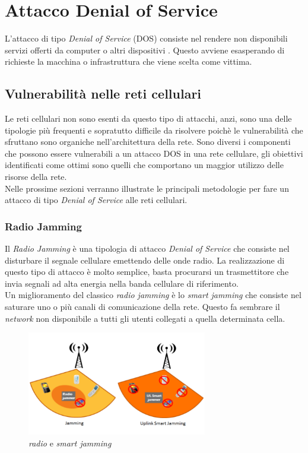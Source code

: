 \chapter{Attacco Denial of Service}
L'attacco di tipo \textit{Denial of Service} (DOS) consiste nel rendere non disponibili servizi offerti da computer o altri
dispositivi \cite{dos-definition}. Questo avviene esasperando di richieste la macchina o infrastruttura che viene scelta come
vittima.

\section{Vulnerabilità nelle reti cellulari}
Le reti cellulari non sono esenti da questo tipo di attacchi, anzi, sono una delle tipologie più frequenti e sopratutto difficile da risolvere
poichè le vulnerabilità che sfruttano sono organiche nell'architettura della rete.
Sono diversi i componenti che possono essere vulnerabili a un attacco DOS in una rete cellulare, gli obiettivi identificati come ottimi sono quelli
che comportano un maggior utilizzo delle risorse della rete.\\
Nelle prossime sezioni verranno illustrate le principali metodologie per fare un attacco di tipo \textit{Denial of Service} alle reti cellulari\cite{4g-dos-recap}.

\subsection{Radio Jamming}
Il \textit{Radio Jamming} è una tipologia di attacco \textit{Denial of Service} che consiste nel disturbare il segnale cellulare emettendo delle onde radio.
La realizzazione di questo tipo di attacco è molto semplice, basta procurarsi un trasmettitore che invia segnali ad alta energia nella banda cellulare di riferimento.\\
Un miglioramento del classico \textit{radio jamming} è lo \textit{smart jamming} che consiste nel saturare uno o più canali di comunicazione della rete. Questo fa sembrare 
il \textit{network} non disponibile a tutti gli utenti collegati a quella determinata cella.
\begin{figure}[h]
    \centering
    \includegraphics[width=0.7\textwidth]{images/dos-jamming.png}
    \caption{\textit{radio} e \textit{smart jamming}\cite{4g-dos-recap}}
\end{figure}\\

